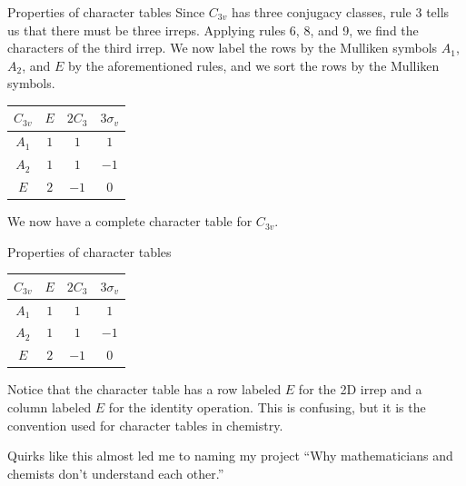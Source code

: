 \documentclass{beamer}
\newcommand{\vs}{\vspace{5mm}}
\begin{document}
    \begin{frame}{Properties of character tables}
        Since $C_{3v}$ has three conjugacy classes, rule 3 tells us that there must be three irreps. Applying rules 6, 8, and 9, we find the characters of the third irrep. We now label the rows by the Mulliken symbols $A_1$, $A_2$, and $E$ by the aforementioned rules, and we sort the rows by the Mulliken symbols.
        
        \begin{table}[htbp]
            \centering
            \renewcommand{\arraystretch}{1.5}
            \begin{tabular}{c|ccc}
                $C_{3v}$ & $E$ & $2C_3$ & $3\sigma_{v}$\\
                \hline
                $A_1$ & $1$ & $1$ & $1$\\
                $A_2$ & $1$ & $1$ & $-1$\\
                $E$ & $2$ & $-1$ & $0$\\
            \end{tabular}
        \end{table}

        We now have a complete character table for $C_{3v}$.
    \end{frame}

    \begin{frame}{Properties of character tables}
        \begin{table}[htbp]
            \centering
            \renewcommand{\arraystretch}{1.5}
            \begin{tabular}{c|ccc}
                $C_{3v}$ & $\boxed{E}$ & $2C_3$ & $3\sigma_{v}$\\
                \hline
                $A_1$ & $1$ & $1$ & $1$\\
                $A_2$ & $1$ & $1$ & $-1$\\
                $\boxed{E}$ & $2$ & $-1$ & $0$\\
            \end{tabular}
        \end{table}
    
        Notice that the character table has a row labeled $E$ for the 2D irrep and a column labeled $E$ for the identity operation. This is confusing, but it is the convention used for character tables in chemistry.
        \vs

        {
            Quirks like this almost led me to naming my project ``Why mathematicians and chemists don't understand each other.''
        }
    \end{frame}
\end{document}
